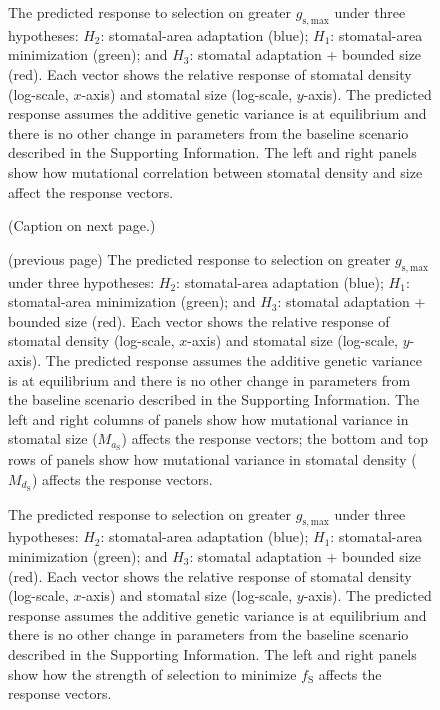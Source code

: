 \documentclass[
  letterpaper,
  DIV=11,
  numbers=noendperiod]{scrartcl}
\begin{document}
\newpage

\begin{figure}
\caption{The predicted response to selection on greater $g_\mathrm{s,max}$ under three hypotheses: $H_2$: stomatal-area adaptation (blue); $H_1$: stomatal-area minimization (green); and $H_3$: stomatal adaptation + bounded size (red). Each vector shows the relative response of stomatal density (log-scale, $x$-axis) and stomatal size (log-scale, $y$-axis). The predicted response assumes the additive genetic variance is at equilibrium and there is no other change in parameters from the baseline scenario described in the Supporting Information. The left and right panels show how mutational correlation between stomatal density and size affect the response vectors.}

\end{figure}

\newpage

\begin{figure}
\caption{(Caption on next page.)}

\end{figure}

\newpage

\begin{figure}
\caption{(previous page) The predicted response to selection on greater $g_\mathrm{s,max}$ under three hypotheses: $H_2$: stomatal-area adaptation (blue); $H_1$: stomatal-area minimization (green); and $H_3$: stomatal adaptation + bounded size (red). Each vector shows the relative response of stomatal density (log-scale, $x$-axis) and stomatal size (log-scale, $y$-axis). The predicted response assumes the additive genetic variance is at equilibrium and there is no other change in parameters from the baseline scenario described in the Supporting Information. The left and right columns of panels show how mutational variance in stomatal size ($M_{a_\mathrm{S}}$) affects the response vectors; the bottom and top rows of panels show how mutational variance in stomatal density ($M_{d_\mathrm{S}}$) affects the response vectors.}
\end{figure}

\newpage

\begin{figure}
\caption{The predicted response to selection on greater $g_\mathrm{s,max}$ under three hypotheses: $H_2$: stomatal-area adaptation (blue); $H_1$: stomatal-area minimization (green); and $H_3$: stomatal adaptation + bounded size (red). Each vector shows the relative response of stomatal density (log-scale, $x$-axis) and stomatal size (log-scale, $y$-axis). The predicted response assumes the additive genetic variance is at equilibrium and there is no other change in parameters from the baseline scenario described in the Supporting Information. The left and right panels show how the strength of selection to minimize $f_\mathrm{S}$ affects the response vectors.}

\end{figure}
\end{document}
